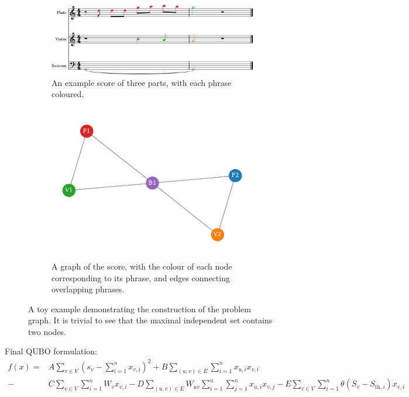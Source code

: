 \documentclass[12pt]{article}
\begin{document}
\begin{figure}
    \begin{subfigure}[t]{0.5\linewidth}
        \includegraphics[width=0.95\linewidth]{../Figures/toy_trim-1.png}
        \caption{An example score of three parts, with each phrase coloured.}
        \label{fig:simple-excerpt}
    \end{subfigure}\hfill
    \begin{subfigure}[t]{0.5\linewidth}
        \includegraphics[width=0.95\linewidth]{../Figures/toy_graph.pdf}
        \caption{A graph of the score, with the colour of each node corresponding to its phrase, and edges connecting overlapping phrases.}
        \label{fig:simple-graph}
    \end{subfigure}
    \caption{A toy example demonstrating the construction of the problem graph. It is trivial to see that the maximal independent set contains two nodes.}
    \label{fig:toy}
\end{figure}

Final QUBO formulation:
\begin{align}
    f(x)=&A\sum_{v \in V}\left(s_v-\sum_{i=1}^{n} x_{v,i}\right)^2+B\sum_{(u,v) \in E}\sum_{i=1}^n x_{u,i}x_{v,i}\\-&C\sum_{v \in V}\sum_{i=1}^n W_vx_{v,i}-D\sum_{(u,v)\in E}W_{uv}\sum_{i=1}^n\sum_{j=1}^n x_{u,i}x_{v,j}-E\sum_{v \in V}\sum_{i=1}^n\theta(S_v-S_{\text{th},i})x_{v,i}
    \label{eq:weightedMIS}
\end{align}
\end{document}

